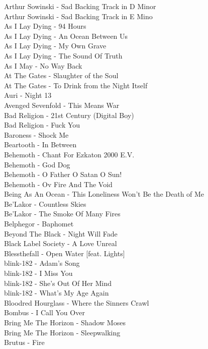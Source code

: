 Arthur Sowinski - Sad Backing Track in D Minor\\
Arthur Sowinski - Sad Backing Track in E Mino\\
As I Lay Dying - 94 Hours\\
As I Lay Dying - An Ocean Between Us\\
As I Lay Dying - My Own Grave\\
As I Lay Dying - The Sound Of Truth\\
As I May - No Way Back\\
At The Gates - Slaughter of the Soul\\
At The Gates - To Drink from the Night Itself\\
Auri - Night 13\\
Avenged Sevenfold - This Means War\\
Bad Religion - 21st Century (Digital Boy)\\
Bad Religion - Fuck You\\
Baroness - Shock Me\\
Beartooth - In Between\\
Behemoth - Chant For Ezkaton 2000 E.V.\\
Behemoth - God Dog\\
Behemoth - O Father O Satan O Sun!\\
Behemoth - Ov Fire And The Void\\
Being As An Ocean - This Loneliness Won't Be the Death of Me\\
Be'Lakor - Countless Skies\\
Be'Lakor - The Smoke Of Many Fires\\
Belphegor - Baphomet\\
Beyond The Black - Night Will Fade\\
Black Label Society - A Love Unreal\\
Blessthefall - Open Water [feat. Lights]\\
blink-182 - Adam's Song\\
blink-182 - I Miss You\\
blink-182 - She's Out Of Her Mind\\
blink-182 - What's My Age Again\\
Bloodred Hourglass - Where the Sinners Crawl\\
Bombus - I Call You Over\\
Bring Me The Horizon - Shadow Moses\\
Bring Me The Horizon - Sleepwalking\\
Brutus - Fire\\
